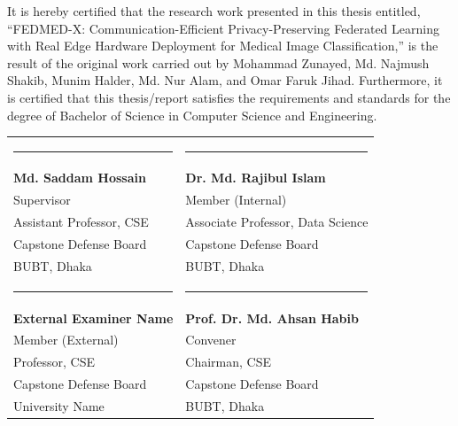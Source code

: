 \documentclass[12pt,a4paper]{report}
\begin{document}
It is hereby certified that the research work presented in this thesis entitled, ``FEDMED-X: Communication-Efficient Privacy-Preserving Federated Learning with Real Edge Hardware Deployment for Medical Image Classification,'' is the result of the original work carried out by Mohammad Zunayed, Md. Najmush Shakib, Munim Halder, Md. Nur Alam, and Omar Faruk Jihad. Furthermore, it is certified that this thesis/report satisfies the requirements and standards for the degree of Bachelor of Science in Computer Science and Engineering.

\vspace{2.5cm}

\noindent
\begin{tabularx}{\textwidth}{@{}X X@{}}
    \rule{6cm}{0.4pt} & \rule{6cm}{0.4pt} \\
    \textbf{Md. Saddam Hossain} & \textbf{Dr. Md. Rajibul Islam} \\
    Supervisor & Member (Internal) \\
    Assistant Professor, CSE & Associate Professor, Data Science \\
    Capstone Defense Board & Capstone Defense Board \\
    BUBT, Dhaka & BUBT, Dhaka \\[2cm]
    
    \rule{6cm}{0.4pt} & \rule{6cm}{0.4pt} \\
    \textbf{External Examiner Name} & \textbf{Prof. Dr. Md. Ahsan Habib} \\
    Member (External) & Convener \\
    Professor, CSE & Chairman, CSE \\
    Capstone Defense Board & Capstone Defense Board \\
    University Name & BUBT, Dhaka \\
\end{tabularx}

\clearpage

\end{document}
